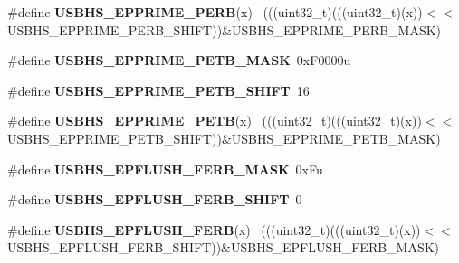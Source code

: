 \begin{DoxyCompactItemize}
\item 
\hypertarget{group___u_s_b_h_s___register___masks_ga9789af14f0e44ede44faaa21fac6be5e}{}\#define {\bfseries U\+S\+B\+H\+S\+\_\+\+E\+P\+P\+R\+I\+M\+E\+\_\+\+P\+E\+R\+B}(x)                                    ~(((uint32\+\_\+t)(((uint32\+\_\+t)(x))$<$$<$U\+S\+B\+H\+S\+\_\+\+E\+P\+P\+R\+I\+M\+E\+\_\+\+P\+E\+R\+B\+\_\+\+S\+H\+I\+F\+T))\&U\+S\+B\+H\+S\+\_\+\+E\+P\+P\+R\+I\+M\+E\+\_\+\+P\+E\+R\+B\+\_\+\+M\+A\+S\+K)\label{group___u_s_b_h_s___register___masks_ga9789af14f0e44ede44faaa21fac6be5e}

\item 
\hypertarget{group___u_s_b_h_s___register___masks_ga1d492724a0c1488f8421818909f45546}{}\#define {\bfseries U\+S\+B\+H\+S\+\_\+\+E\+P\+P\+R\+I\+M\+E\+\_\+\+P\+E\+T\+B\+\_\+\+M\+A\+S\+K}~0x\+F0000u\label{group___u_s_b_h_s___register___masks_ga1d492724a0c1488f8421818909f45546}

\item 
\hypertarget{group___u_s_b_h_s___register___masks_ga563535811c2005c2df56e58ee9688a39}{}\#define {\bfseries U\+S\+B\+H\+S\+\_\+\+E\+P\+P\+R\+I\+M\+E\+\_\+\+P\+E\+T\+B\+\_\+\+S\+H\+I\+F\+T}~16\label{group___u_s_b_h_s___register___masks_ga563535811c2005c2df56e58ee9688a39}

\item 
\hypertarget{group___u_s_b_h_s___register___masks_gad6b116cb64179a7fdf06ae34977d2401}{}\#define {\bfseries U\+S\+B\+H\+S\+\_\+\+E\+P\+P\+R\+I\+M\+E\+\_\+\+P\+E\+T\+B}(x)                                    ~(((uint32\+\_\+t)(((uint32\+\_\+t)(x))$<$$<$U\+S\+B\+H\+S\+\_\+\+E\+P\+P\+R\+I\+M\+E\+\_\+\+P\+E\+T\+B\+\_\+\+S\+H\+I\+F\+T))\&U\+S\+B\+H\+S\+\_\+\+E\+P\+P\+R\+I\+M\+E\+\_\+\+P\+E\+T\+B\+\_\+\+M\+A\+S\+K)\label{group___u_s_b_h_s___register___masks_gad6b116cb64179a7fdf06ae34977d2401}

\item 
\hypertarget{group___u_s_b_h_s___register___masks_ga9edb1937953782973ef17a82f1359c6c}{}\#define {\bfseries U\+S\+B\+H\+S\+\_\+\+E\+P\+F\+L\+U\+S\+H\+\_\+\+F\+E\+R\+B\+\_\+\+M\+A\+S\+K}~0x\+Fu\label{group___u_s_b_h_s___register___masks_ga9edb1937953782973ef17a82f1359c6c}

\item 
\hypertarget{group___u_s_b_h_s___register___masks_ga535f5dd059c0449aaf9f7d0ea5340bb4}{}\#define {\bfseries U\+S\+B\+H\+S\+\_\+\+E\+P\+F\+L\+U\+S\+H\+\_\+\+F\+E\+R\+B\+\_\+\+S\+H\+I\+F\+T}~0\label{group___u_s_b_h_s___register___masks_ga535f5dd059c0449aaf9f7d0ea5340bb4}

\item 
\hypertarget{group___u_s_b_h_s___register___masks_ga874e3df2bcc88c65874e6b7df6851e79}{}\#define {\bfseries U\+S\+B\+H\+S\+\_\+\+E\+P\+F\+L\+U\+S\+H\+\_\+\+F\+E\+R\+B}(x)                                    ~(((uint32\+\_\+t)(((uint32\+\_\+t)(x))$<$$<$U\+S\+B\+H\+S\+\_\+\+E\+P\+F\+L\+U\+S\+H\+\_\+\+F\+E\+R\+B\+\_\+\+S\+H\+I\+F\+T))\&U\+S\+B\+H\+S\+\_\+\+E\+P\+F\+L\+U\+S\+H\+\_\+\+F\+E\+R\+B\+\_\+\+M\+A\+S\+K)\label{group___u_s_b_h_s___register___masks_ga874e3df2bcc88c65874e6b7df6851e79}


\end{DoxyCompactItemize}
